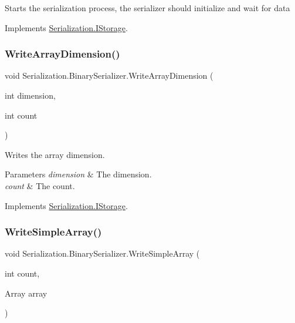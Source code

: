 Starts the serialization process, the serializer should initialize and wait for data 



Implements \hyperlink{interface_serialization_1_1_i_storage_a0f040f49872c3bf4ba92a350494e45af}{Serialization.\+I\+Storage}.

\mbox{\label{class_serialization_1_1_binary_serializer_adf00734419149ffd0f8999876c1120b0}} 
\subsubsection{\texorpdfstring{Write\+Array\+Dimension()}{WriteArrayDimension()}}
{\footnotesize\ttfamily void Serialization.\+Binary\+Serializer.\+Write\+Array\+Dimension (\begin{DoxyParamCaption}\item[{int}]{dimension,  }\item[{int}]{count }\end{DoxyParamCaption})\hspace{0.3cm}{\ttfamily [inline]}}



Writes the array dimension. 


\begin{DoxyParams}{Parameters}
{\em dimension} & The dimension.\\
\hline
{\em count} & The count.\\
\hline
\end{DoxyParams}


Implements \hyperlink{interface_serialization_1_1_i_storage_a844c1dfe7f787cbf76d0521ca4ea11ef}{Serialization.\+I\+Storage}.

\mbox{\label{class_serialization_1_1_binary_serializer_ad694b37d2693fb305f569bebe076b9f8}} 
\subsubsection{\texorpdfstring{Write\+Simple\+Array()}{WriteSimpleArray()}}
{\footnotesize\ttfamily void Serialization.\+Binary\+Serializer.\+Write\+Simple\+Array (\begin{DoxyParamCaption}\item[{int}]{count,  }\item[{Array}]{array }\end{DoxyParamCaption})\hspace{0.3cm}{\ttfamily [inline]}}




